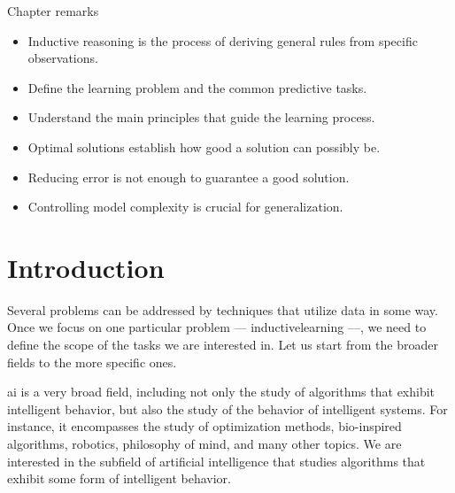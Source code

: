 \begin{mainbox}{Chapter remarks}


  \startcontents[chapters]
  \vspace{1em}


  \begin{itemize}
    \itemsep0em
    \item Inductive reasoning is the process of deriving general rules from specific
      observations.
  \end{itemize}


  \begin{itemize}
    \itemsep0em
    \item Define the learning problem and the common predictive tasks.
    \item Understand the main principles that guide the learning process.
  \end{itemize}


  \begin{itemize}
    \itemsep0em
    \item Optimal solutions establish how good a solution can possibly be.
    \item Reducing error is not enough to guarantee a good solution.
    \item Controlling model complexity is crucial for generalization.
  \end{itemize}
\end{mainbox}

{}
\clearpage

\section{Introduction} %

Several problems can be addressed by techniques that utilize data in some way.  Once we focus on
one particular problem --- \gls{inductivelearning} ---, we need to define the scope of the
tasks we are interested in.  Let us start from the broader fields to the more specific
ones.

\Gls{ai} is a very broad field, including not only the study of algorithms
that exhibit intelligent behavior, but also the study of the behavior of intelligent
systems.  For instance, it encompasses the study of optimization methods, bio-inspired algorithms,
robotics, philosophy of mind, and many other topics.  We are interested in the subfield of
artificial intelligence that studies algorithms that exhibit some form of intelligent
behavior.

